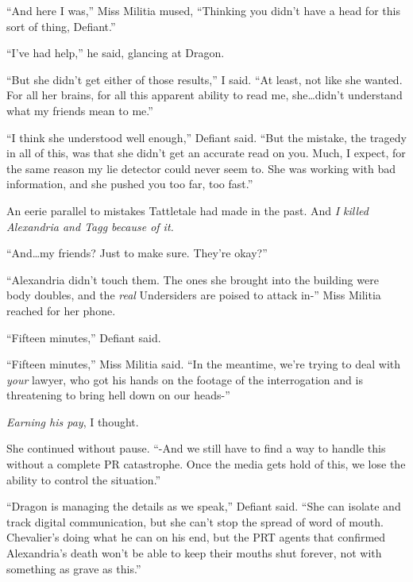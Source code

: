 ``And here I was,'' Miss Militia mused, ``Thinking you didn't have a head for this sort of thing, Defiant.''



``I've had help,'' he said, glancing at Dragon.



``But she didn't get either of those results,'' I said.  ``At least, not like she wanted.  For all her brains, for all this apparent ability to read me, she\ldots didn't understand what my friends mean to me.''



``I think she understood well enough,'' Defiant said.  ``But the mistake, the tragedy in all of this, was that she didn't get an accurate read on you.  Much, I expect, for the same reason my lie detector could never seem to.  She was working with bad information, and she pushed you too far, too fast.''



An eerie parallel to mistakes Tattletale had made in the past.  And\emph{ I killed Alexandria and Tagg because of it.}



``And\ldots my friends?  Just to make sure.  They're okay?''



``Alexandria didn't touch them.  The ones she brought into the building were body doubles, and the \emph{real }Undersiders are poised to attack in-''  Miss Militia reached for her phone.



``Fifteen minutes,'' Defiant said.



``Fifteen minutes,'' Miss Militia said.  ``In the meantime, we're trying to deal with \emph{your} lawyer, who got his hands on the footage of the interrogation and is threatening to bring hell down on our heads-''



\emph{Earning his pay}, I thought.



She continued without pause.  ``-And we still have to find a way to handle this without a complete PR catastrophe.  Once the media gets hold of this, we lose the ability to control the situation.''



``Dragon is managing the details as we speak,'' Defiant said.  ``She can isolate and track digital communication, but she can't stop the spread of word of mouth.  Chevalier's doing what he can on his end, but the PRT agents that confirmed Alexandria's death won't be able to keep their mouths shut forever, not with something as grave as this.''



